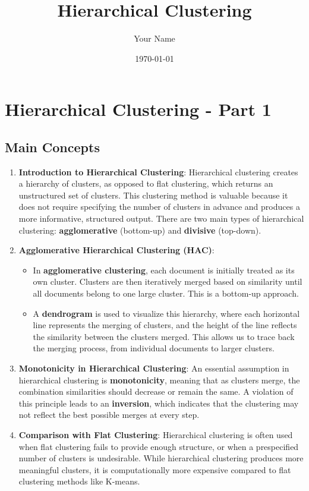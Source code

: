 \documentclass[a4paper,12pt]{article}
\title{Hierarchical Clustering}
\author{Your Name}
\date{\today}
\begin{document}
\maketitle

\section{Hierarchical Clustering - Part 1}

\subsection{Main Concepts}

\begin{enumerate}
    \item \textbf{Introduction to Hierarchical Clustering}:  
    Hierarchical clustering creates a hierarchy of clusters, as opposed to flat clustering, which returns an unstructured set of clusters. This clustering method is valuable because it does not require specifying the number of clusters in advance and produces a more informative, structured output. There are two main types of hierarchical clustering: \textbf{agglomerative} (bottom-up) and \textbf{divisive} (top-down).

    \item \textbf{Agglomerative Hierarchical Clustering (HAC)}:
    \begin{itemize}
        \item In \textbf{agglomerative clustering}, each document is initially treated as its own cluster. Clusters are then iteratively merged based on similarity until all documents belong to one large cluster. This is a bottom-up approach.
        \item A \textbf{dendrogram} is used to visualize this hierarchy, where each horizontal line represents the merging of clusters, and the height of the line reflects the similarity between the clusters merged. This allows us to trace back the merging process, from individual documents to larger clusters.
    \end{itemize}

    \item \textbf{Monotonicity in Hierarchical Clustering}:  
    An essential assumption in hierarchical clustering is \textbf{monotonicity}, meaning that as clusters merge, the combination similarities should decrease or remain the same. A violation of this principle leads to an \textbf{inversion}, which indicates that the clustering may not reflect the best possible merges at every step.

    \item \textbf{Comparison with Flat Clustering}:  
    Hierarchical clustering is often used when flat clustering fails to provide enough structure, or when a prespecified number of clusters is undesirable. While hierarchical clustering produces more meaningful clusters, it is computationally more expensive compared to flat clustering methods like K-means.
\end{enumerate}
\end{document}
